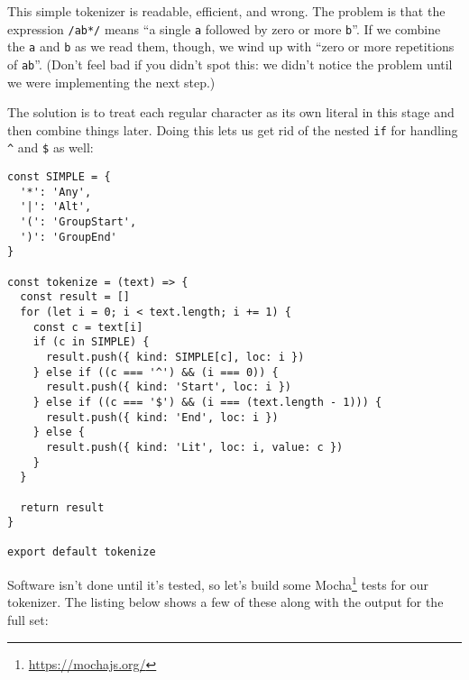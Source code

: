 \documentclass[krantzl]{krantz}
\newcommand{\hreffoot}[2]{{#1}\footnote{\href{#2}{#2}}}
\begin{document}
This simple tokenizer is readable, efficient, and wrong.
The problem is that the expression \texttt{/ab*/} means “a single \texttt{a} followed by zero or more \texttt{b}”.
If we combine the \texttt{a} and \texttt{b} as we read them,
though,
we wind up with “zero or more repetitions of \texttt{ab}”.
(Don’t feel bad if you didn’t spot this:
we didn’t notice the problem until we were implementing the next step.)


The solution is to treat each regular character as its own literal in this stage
and then combine things later.
Doing this lets us get rid of the nested \texttt{if} for handling \texttt{{\textasciicircum}} and \texttt{\$} as well:


\begin{lstlisting}[frame=tblr]
const SIMPLE = {
  '*': 'Any',
  '|': 'Alt',
  '(': 'GroupStart',
  ')': 'GroupEnd'
}

const tokenize = (text) => {
  const result = []
  for (let i = 0; i < text.length; i += 1) {
    const c = text[i]
    if (c in SIMPLE) {
      result.push({ kind: SIMPLE[c], loc: i })
    } else if ((c === '^') && (i === 0)) {
      result.push({ kind: 'Start', loc: i })
    } else if ((c === '$') && (i === (text.length - 1))) {
      result.push({ kind: 'End', loc: i })
    } else {
      result.push({ kind: 'Lit', loc: i, value: c })
    }
  }

  return result
}

export default tokenize
\end{lstlisting}



Software isn’t done until it’s tested,
so let’s build some \hreffoot{Mocha}{https://mochajs.org/} tests for our tokenizer.
The listing below shows a few of these
along with the output for the full set:
\end{document}
